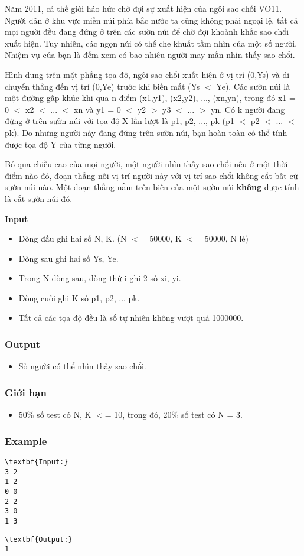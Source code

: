 

Năm 2011, cả thế giới háo hức chờ đợi sự xuất hiện của ngôi sao chổi VO11. Người dân ở khu vực miền núi phía bắc nước ta cũng không phải ngoại lệ, tất cả mọi người đều đang đứng ở trên các sườn núi để chờ đợi khoảnh khắc sao chổi xuất hiện. Tuy nhiên, các ngọn núi có thể che khuất tầm nhìn của một số người. Nhiệm vụ của bạn là đếm xem có bao nhiêu người may mắn nhìn thấy sao chổi.

Hình dung trên mặt phẳng tọa độ, ngôi sao chổi xuất hiện ở vị trí (0,Ys) và di chuyển thẳng đến vị trí (0,Ye) trước khi biến mất (Ys $<$ Ye). Các sườn núi là một đường gấp khúc khi qua n điểm (x1,y1), (x2,y2), ..., (xn,yn), trong đó x1 = 0 $<$ x2 $<$ ... $<$ xn và y1 = 0 $<$ y2 $>$ y3 $<$ ... $>$ yn. Có k người đang đứng ở trên sườn núi với tọa độ X lần lượt là p1, p2, ..., pk (p1 $<$ p2 $<$ ... $<$ pk). Do những người này đang đứng trên sườn núi, bạn hoàn toàn có thể tính được tọa độ Y của từng người.

Bỏ qua chiều cao của mọi người, một người nhìn thấy sao chổi nếu ở một thời điểm nào đó, đoạn thẳng nối vị trí người này với vị trí sao chổi không cắt bất cứ sườn núi nào. Một đoạn thẳng nằm trên biên của một sườn núi \textbf{ không } được tính là cắt sườn núi đó.

\textbf{Input }
\begin{itemize}
	\item Dòng đầu ghi hai số N, K. (N $<$= 50000, K $<$= 50000, N lẻ)
	\item Dòng sau ghi hai số Ys, Ye.
	\item Trong N dòng sau, dòng thứ i ghi 2 số xi, yi.
	\item Dòng cuối ghi K số p1, p2, ... pk.
	\item Tất cả các tọa độ đều là số tự nhiên không vượt quá 1000000.
\end{itemize}

\subsubsection{Output}
\begin{itemize}
	\item Số người có thể nhìn thấy sao chổi.
\end{itemize}

\subsubsection{Giới hạn}
\begin{itemize}
	\item 50\% số test có N, K $<$= 10, trong đó, 20\% số test có N = 3.
\end{itemize}

\subsubsection{Example}
\begin{verbatim}
\textbf{Input:}
3 2
1 2
0 0
2 2
3 0
1 3\end{verbatim}
\begin{verbatim}
\textbf{Output:}
1\end{verbatim}